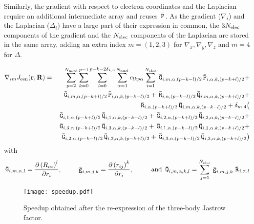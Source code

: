 Similarly, the gradient with respect to electron coordinates and the
Laplacian require an additional intermediate array and reuses ${\, \bar{\mathtt{P}}}$. As
the gradient ($\nabla_{i}$) and the Laplacian ($\Delta_i$) have a
large part of their expression in common, the $3N_{\text{elec}}$ components of
the gradient and the $N_{\text{elec}}$ components of the Laplacian are stored in
the same array, adding an extra index $m=(1,2,3)$ for $\nabla_x,
\nabla_y,\nabla_z$
and $m=4$ for $\Delta$.

\newcommand{\tg}{\, \bar{\mathtt{g}}}
\newcommand{\tG}{\, \bar{\mathtt{G}}}
\newcommand{\tQ}{\, \bar{\mathtt{Q}}}

\begin{eqnarray*}
  \nabla_{im} \Jeen(\br,\bR) & = &
  \sum_{p=2}^{\Nord}\sum_{k=0}^{p-1}
  \sum_{l=0}^{\lmax} 
    \sum_{\alpha=1}^{\Nat}
    c_{lkp\alpha}
    \sum_{i=1}^{\Nel} 
     {\tG}_{i,m,\alpha,(p-k-l)/2} {\tP}_{i,\alpha,k,(p-k+l)/2} +  \\
&&   {\tG}_{i,m,\alpha,(p-k+l)/2} {\tP}_{i,\alpha,k,(p-k-l)/2} + 
     {\tR}_{i,\alpha,(p-k-l)/2} {\tQ}_{i,m,\alpha,k,(p-k+l)/2} + \\
&&   {\tR}_{i,\alpha,(p-k+l)/2} {\tQ}_{i,m,\alpha,k,(p-k-l)/2} + 
    \delta_{m,4} \big( \\
&&     {\tG}_{i,1,\alpha,(p-k+l)/2} {\tQ}_{i,1,\alpha,k,(p-k-l)/2} +
       {\tG}_{i,2,\alpha,(p-k+l)/2} {\tQ}_{i,2,\alpha,k,(p-k-l)/2} + \\
&&     {\tG}_{i,3,\alpha,(p-k+l)/2} {\tQ}_{i,3,\alpha,k,(p-k-l)/2} +
       {\tG}_{i,1,\alpha,(p-k-l)/2} {\tQ}_{i,1,\alpha,k,(p-k+l)/2} + \\
&&     {\tG}_{i,2,\alpha,(p-k-l)/2} {\tQ}_{i,2,\alpha,k,(p-k+l)/2} + 
       {\tG}_{i,3,\alpha,(p-k-l)/2} {\tQ}_{i,3,\alpha,k,(p-k+l)/2} \big)
\end{eqnarray*}
with 
\[
  {\tG}_{i, m, \alpha, l}  =  \frac{\partial \left( {R}_{i\alpha} \right)^l}
                             {\partial r_i},  \phantom{ space }
  {\tg}_{i, m, j, k}  =  \frac{\partial \left( {r}_{ij} \right)^k}
                             {\partial r_i}, \phantom{ space }
                             \text{ and } 
  {\tQ}_{i, m, \alpha, k, l}  =  \sum_{j=1}^{\Nel}
                            {\tg}_{i,m,j,k}\,{\tR}_{j,\alpha,l} 
\]
  
\begin{figure}[t]
  \begin{center}
  \texttt{[image: speedup.pdf]}
  \end{center}
  \caption{\label{fig:speedup}Speedup obtained after the re-expression of the three-body
    Jastrow factor.}
\end{figure}


